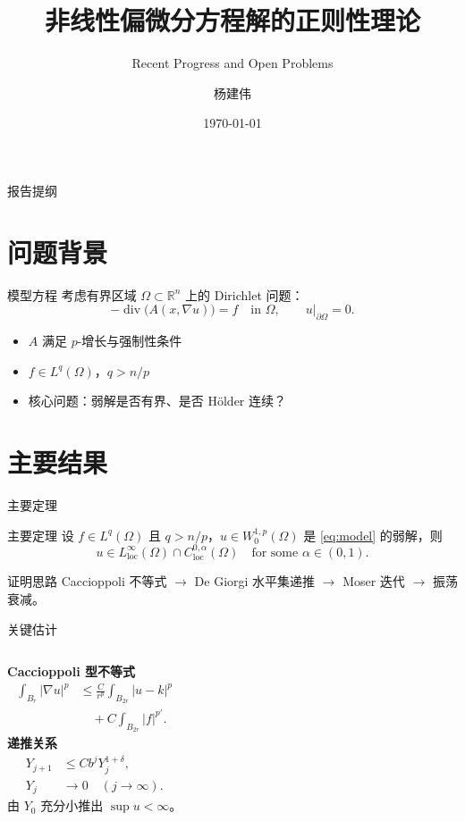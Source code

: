 \documentclass[UTF8,10pt]{beamer}
\title[简报标题]{非线性偏微分方程解的正则性理论}
\subtitle{Recent Progress and Open Problems}
\author{杨建伟}
\institute{华北水利水电大学 \quad 数学与统计学院}
\date{\today}
\newcommand{\R}{\mathbb{R}}
\newcommand{\Om}{\Omega}
\DeclareMathOperator{\divg}{div}
\begin{document}
\frame{\titlepage}

\begin{frame}{报告提纲}
\tableofcontents
\end{frame}

\section{问题背景}
\begin{frame}{模型方程}
考虑有界区域 $\Om\subset\R^n$ 上的 Dirichlet 问题：
\begin{equation}\label{eq:model}
  -\divg\bigl(A(x,\nabla u)\bigr)=f \quad \text{in }\Om,
  \qquad u|_{\partial\Om}=0 .
\end{equation}

\begin{itemize}
  \item $A$ 满足 $p$-增长与强制性条件 
  \item $f\in L^q(\Om)$，$q>n/p$
  \item 核心问题：\alert{弱解是否有界、是否 Hölder 连续？}
\end{itemize}
\end{frame}

\section{主要结果}
\begin{frame}{主要定理}
\begin{block}{主要定理}
设 $f\in L^q(\Om)$ 且 $q>n/p$，$u\in W^{1,p}_0(\Om)$ 是
\eqref{eq:model} 的弱解，则
\begin{equation}
  u\in L^\infty_{\mathrm{loc}}(\Om)\cap C^{0,\alpha}_{\mathrm{loc}}(\Om)
  \quad\text{for some } \alpha\in(0,1).
\end{equation}
\end{block}

\pause
\begin{block}{证明思路}
Caccioppoli 不等式 $\longrightarrow$ De Giorgi 水平集递推
$\longrightarrow$ Moser 迭代 $\longrightarrow$ 振荡衰减。
\end{block}
\end{frame}

\begin{frame}{关键估计}
\begin{columns}[T]
\textbf{Caccioppoli 型不等式}
\begin{align*}
  \int_{B_r}|\nabla u|^p
  &\le \frac{C}{r^p}\int_{B_{2r}}|u-k|^p \\
  &\quad + C\int_{B_{2r}}|f|^{p'} .
\end{align*}
\textbf{递推关系}
\begin{align*}
  Y_{j+1} &\le C b^j Y_j^{1+\delta},\\
  Y_j &\to 0 \quad (j\to\infty).
\end{align*}
由 $Y_0$ 充分小推出 $\sup u<\infty$。
\end{columns}
\end{frame}
\end{document}
